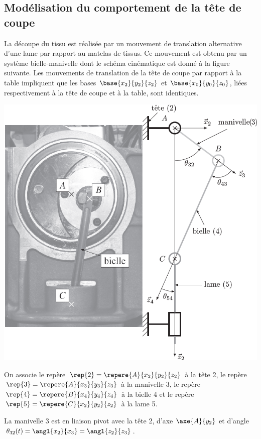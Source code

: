 \begin{multicols}{2}
\subsection*{Modélisation du comportement de la tête de coupe}

La découpe du tissu est réalisée par un mouvement de translation alternative d’une lame par rapport
au matelas de tissus. Ce mouvement est obtenu par un système bielle-manivelle dont le schéma cinématique
est donné à la figure suivante. Les mouvements de translation de la tête de coupe par rapport à la
table impliquent que les bases $\base{x_2}{y_2}{z_2}$ et $\base{x_0}{y_0}{z_0}$, liées respectivement à la tête de coupe et à la table, sont identiques.

\begin{center}
\includegraphics[width=\linewidth]{images/fig_03}
\end{center}

On associe le repère $\rep{2}=\repere{A}{x_2}{y_2}{z_2}$ à la tête 2, le repère $\rep{3}=\repere{A}{x_3}{y_3}{z_3}$ à la manivelle 3, le repère $\rep{4}=\repere{B}{x_4}{y_4}{z_4}$ à la bielle 4 et le repère $\rep{5}=\repere{C}{x_2}{y_2}{z_2}$ à la lame 5.

La manivelle 3 est en liaison pivot avec la tête 2, d'axe $\axe{A}{y_2}$ et d'angle $\theta_{32}(t)=\angl{x_2}{x_3}=\angl{z_2}{z_3}$.


\end{multicols}
